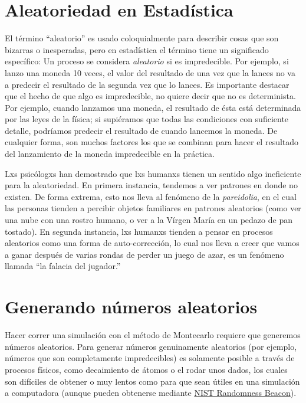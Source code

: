 \documentclass[
  12pt,
]{book}
\theoremstyle{definition}
\theoremstyle{definition}
\theoremstyle{definition}
\theoremstyle{remark}
\begin{document}
\hypertarget{aleatoriedad-en-estaduxedstica}{%
\section{Aleatoriedad en Estadística}\label{aleatoriedad-en-estaduxedstica}}

El término ``aleatorio'' es usado coloquialmente para describir cosas que son bizarras o inesperadas, pero en estadística el término tiene un significado específico: Un proceso se considera \emph{aleatorio} si es impredecible. Por ejemplo, si lanzo una moneda 10 veces, el valor del resultado de una vez que la lances no va a predecir el resultado de la segunda vez que lo lances. Es importante destacar que el hecho de que algo es impredecible, no quiere decir que no es determinista. Por ejemplo, cuando lanzamos una moneda, el resultado de ésta está determinada por las leyes de la física; si supiéramos que todas las condiciones con suficiente detalle, podríamos predecir el resultado de cuando lancemos la moneda. De cualquier forma, son muchos factores los que se combinan para hacer el resultado del lanzamiento de la moneda impredecible en la práctica.

Lxs psicólogxs han demostrado que lxs humanxs tienen un sentido algo ineficiente para la aleatoriedad. En primera instancia, tendemos a ver patrones en donde no existen. De forma extrema, esto nos lleva al fenómeno de la \emph{pareidolia}, en el cual las personas tienden a percibir objetos familiares en patrones aleatorios (como ver una nube con una rostro humano, o ver a la Vírgen María en un pedazo de pan tostado). En segunda instancia, lxs humanxs tienden a pensar en procesos aleatorios como una forma de auto-corrección, lo cual nos lleva a creer que vamos a ganar después de varias rondas de perder un juego de azar, es un fenómeno llamada ``la falacia del jugador.''

\hypertarget{generando-nuxfameros-aleatorios}{%
\section{Generando números aleatorios}\label{generando-nuxfameros-aleatorios}}

Hacer correr una simulación con el método de Montecarlo requiere que generemos números aleatorios. Para generar números genuinamente aleatorios (por ejemplo, números que son completamente impredecibles) es solamente posible a través de procesos físicos, como decaimiento de átomos o el rodar unos dados, los cuales son difíciles de obtener o muy lentos como para que sean útiles en una simulación a computadora (aunque pueden obtenerse mediante \href{https://www.nist.gov/programs-projects/nist-randomness-beacon\%5D}{NIST Randomness Beacon}).
\end{document}
